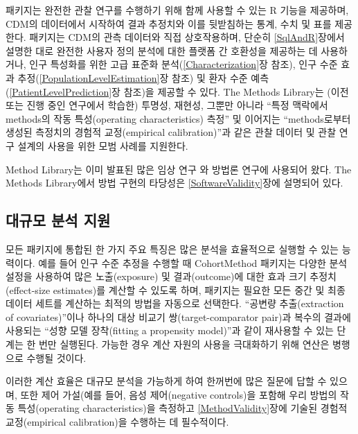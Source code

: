 \documentclass[11pt]{book}
\theoremstyle{definition}
\theoremstyle{definition}
\theoremstyle{definition}
\theoremstyle{remark}
\begin{document}
패키지는 완전한 관찰 연구를 수행하기 위해 함께 사용할 수 있는 R 기능을
제공하며, CDM의 데이터에서 시작하여 결과 추정치와 이를 뒷받침하는 통계,
수치 및 표를 제공한다. 패키지는 CDM의 관측 데이터와 직접 상호작용하며,
단순히 \ref{SqlAndR}장에서 설명한 대로 완전한 사용자 정의 분석에 대한
플랫폼 간 호환성을 제공하는 데 사용하거나, 인구 특성화를 위한 고급
표준화 분석(\ref{Characterization}장 참조), 인구 수준 효과
추정(\ref{PopulationLevelEstimation}장 참조) 및 환자 수준
예측(\ref{PatientLevelPrediction}장 참조)을 제공할 수 있다. The Methods
Library는 (이전 또는 진행 중인 연구에서 학습한) 투명성, 재현성, 그뿐만
아니라 ``특정 맥락에서 methods의 작동 특성(operating characteristics)
측정'' 및 이어지는 ``methods로부터 생성된 측정치의 경험적 교정(empirical
calibration)''과 같은 관찰 데이터 및 관찰 연구 설계의 사용을 위한 모범
사례를 지원한다.

Method Library는 이미 발표된 많은 임상 연구
\citep{boland_2017, duke_2017, ramcharran_2017, weinstein_2017, wang_2017, ryan_2017, ryan_2018, vashisht_2018, yuan_2018, johnston_2019}와
방법론 연구에 사용되어 왔다.
\citep{schuemie_2014, schuemie_2016, reps2018, tian_2018, schuemie_2018, schuemie_2018b, reps_2019}
The Methods Library에서 방법 구현의 타당성은 \ref{SoftwareValidity}장에
설명되어 있다.

\subsection{대규모 분석 지원}\label{--}

모든 패키지에 통합된 한 가지 주요 특징은 많은 분석을 효율적으로 실행할
수 있는 능력이다. 예를 들어 인구 수준 추정을 수행할 때 CohortMethod
패키지는 다양한 분석 설정을 사용하여 많은 노출(exposure) 및
결과(outcome)에 대한 효과 크기 추정치(effect-size estimates)를 계산할 수
있도록 하며, 패키지는 필요한 모든 중간 및 최종 데이터 세트를 계산하는
최적의 방법을 자동으로 선택한다. ``공변량 추출(extraction of
covariates)''이나 하나의 대상 비교기 쌍(target-comparator pair)과 복수의
결과에 사용되는 ``성향 모델 장착(fitting a propensity model)''과 같이
재사용할 수 있는 단계는 한 번만 실행된다. 가능한 경우 계산 자원의 사용을
극대화하기 위해 연산은 병행으로 수행될 것이다.

이러한 계산 효율은 대규모 분석을 가능하게 하여 한꺼번에 많은 질문에 답할
수 있으며, 또한 제어 가설(예를 들어, 음성 제어(negative controls)을
포함해 우리 방법의 작동 특성(operating characteristics)을 측정하고
\ref{MethodValidity}장에 기술된 경험적 교정(empirical calibration)을
수행하는 데 필수적이다. 
\end{document}

